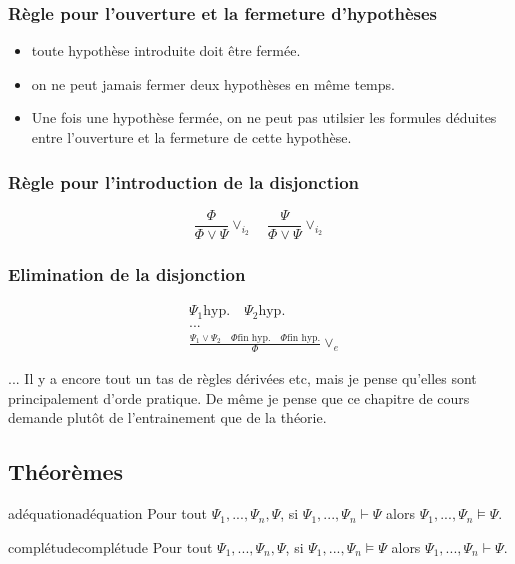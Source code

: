\documentclass[a4paper, 12pt]{extarticle}
\begin{document}
\subsubsection{Règle pour l'ouverture et la fermeture d'hypothèses}
\begin{itemize}[label=$\bullet$]
  \item toute hypothèse introduite doit être fermée.
  \item on ne peut jamais fermer deux hypothèses en même temps.
  \item Une fois une hypothèse fermée, on ne peut pas utilsier les formules déduites entre l'ouverture et la fermeture de cette hypothèse.
\end{itemize}


\subsubsection{Règle pour l'introduction de la disjonction}
\begin{equation*}
  \frac{\Phi}{\Phi\lor\Psi}\lor_{i_2}\quad\frac{\Psi}{\Phi\lor\Psi}\lor_{i_2}
\end{equation*}

\subsubsection{Elimination de la disjonction}
  \begin{align*}
    &\Psi_1 \text{hyp.} \quad \Psi_2 \text{hyp.} \\
    &...\\
    &\frac{\Psi_1\lor\Psi_2\quad\Phi\text{fin hyp.}\quad\Phi\text{fin hyp.}}{\Phi}\lor_e
  \end{align*}


\begin{remark}
  ... Il y a encore tout un tas de règles dérivées etc, mais je pense qu'elles sont principalement d'orde pratique. De même je pense que ce chapitre de cours demande plutôt de l'entrainement que de la théorie.
\end{remark}

\subsection{Théorèmes}
\begin{definition}{adéquation}{adéquation}
  Pour tout $\Psi_1,...,\Psi_n,\Psi$, si $\Psi_1,...,\Psi_n\vdash\Psi$ alors $\Psi_1,...,\Psi_n\vDash\Psi$.
\end{definition}
\begin{definition}{complétude}{complétude}
  Pour tout $\Psi_1,...,\Psi_n,\Psi$, si $\Psi_1,...,\Psi_n\vDash\Psi$ alors $\Psi_1,...,\Psi_n\vdash\Psi$.
\end{definition}





\end{document}

